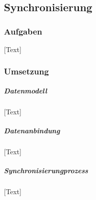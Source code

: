 
\subsection{Synchronisierung}

\subsubsection{Aufgaben}
[Text]

\subsubsection{Umsetzung}

\subparagraph{Datenmodell}
[Text]

\subparagraph{Datenanbindung}
[Text]

\subparagraph{Synchronisierungprozess}
[Text]
